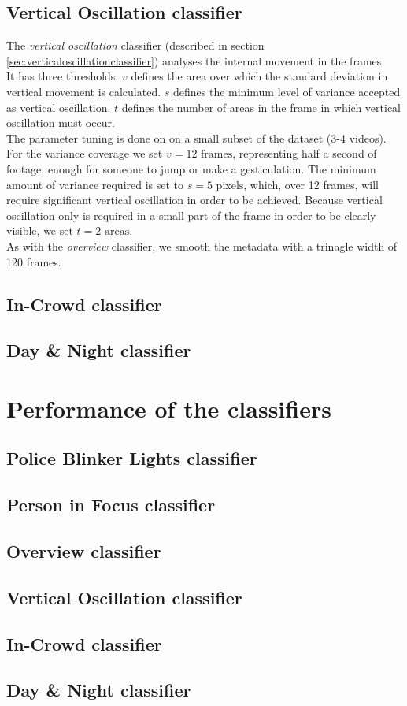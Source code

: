 \subsection{Vertical Oscillation classifier}
%
The \textit{vertical oscillation} classifier (described in section \ref{sec:verticaloscillationclassifier}) analyses the internal movement in the frames.\\
It has three thresholds. $v$ defines the area over which the standard deviation in vertical movement is calculated. $s$ defines the minimum level of variance accepted as vertical oscillation. $t$ defines the number of areas in the frame in which vertical oscillation must occur.\\
The parameter tuning is done on on a small subset of the dataset (3-4 videos). For the variance coverage we set $v = 12 \text{ frames}$, representing half a second of footage, enough for someone to jump or make a gesticulation. The minimum amount of variance required is set to $s = 5 \text{ pixels}$, which, over 12 frames, will require significant vertical oscillation in order to be achieved. Because vertical oscillation only is required in a small part of the frame in order to be clearly visible, we set $t = 2 \text{ areas}$.\\
As with the \textit{overview} classifier, we smooth the metadata with a trinagle width of 120 frames.
%
\subsection{In-Crowd classifier}
\subsection{Day \& Night classifier}
%
\section{Performance of the classifiers}
%
%
\subsection{Police Blinker Lights classifier}
\subsection{Person in Focus classifier}
\subsection{Overview classifier}
\subsection{Vertical Oscillation classifier}
\subsection{In-Crowd classifier}
\subsection{Day \& Night classifier}
%
